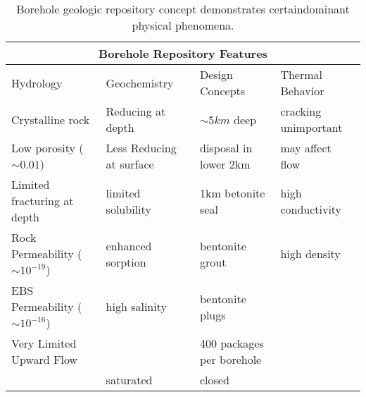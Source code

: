%
\begin{table}[h!]
  \centering
  \footnotesize{
  \begin{tabularx}{\textwidth}{|X|X|X|X|}
    \multicolumn{4}{c}{\textbf{Borehole Repository Features}}\\
    \hline
    Hydrology & Geochemistry & Design Concepts & Thermal Behavior \\ 
    \hline
    Crystalline rock&Reducing at depth& $\sim5km$ deep & cracking unimportant\\
    Low porosity ($\sim 0.01$)&Less Reducing at surface& disposal in lower 2km &may affect flow\\
    Limited fracturing at depth&limited solubility &1km betonite seal & high conductivity\\
    Rock Permeability ($\sim 10^{-19}$) &enhanced sorption &bentonite grout &high density\\
    EBS Permeability ($\sim 10^{-16}$) &high salinity&bentonite plugs&\\
    Very Limited Upward Flow&&400 packages per borehole&\\
    &saturated&closed&\\
    \hline
  \end{tabularx}
  \caption[Borehole repository features.]{Borehole geologic repository 
  concept demonstrates certaindominant physical phenomena. }
  \label{tab:borehole_tab}
  }
\end{table}
